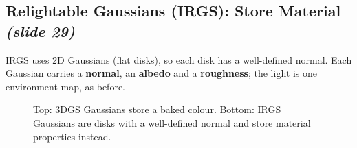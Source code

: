 \documentclass[11pt,a4paper]{article}
\newcommand{\slideone}[1]{\texorpdfstring{\emph{(slide #1)}}{(slide #1)}}
\newcommand{\w}{{\bm{\omega}}}
\newcommand{\xx}{\boldsymbol{x}}
\theoremstyle{definition}
\theoremstyle{plain}
\theoremstyle{remark}
\begin{document}
\subsection{Relightable Gaussians (IRGS): Store Material \slideone{29}}

IRGS uses 2D Gaussians (flat disks), so each disk has a well-defined normal. Each Gaussian carries a \textbf{normal}, an \textbf{albedo} and a \textbf{roughness}; the light is one environment map, as before.

\begin{figure}[!htbp]\centering
\newcommand{\gaussians}{%
 \draw[-Latex,thick] (7.6,0)--(0.7,0);
 \draw[thick,fill=blue!35] (0.3,0) circle (0.22);
 \begin{scope}[rotate around={15:(2.6,0)}]\filldraw[fill=blue!25,draw=blue!50] (2.6,0) ellipse (0.95 and 0.3);\end{scope}
 \begin{scope}[rotate around={85:(4.6,0)}]\filldraw[fill=red!25,draw=red!50] (4.6,0) ellipse (0.8 and 0.28);\end{scope}
 \begin{scope}[rotate around={-30:(6.6,0)}]\filldraw[fill=violet!25,draw=violet!50] (6.6,0) ellipse (0.9 and 0.3);\end{scope}}
\caption{Top: 3DGS Gaussians store a baked colour. Bottom: IRGS Gaussians are disks with a well-defined normal and store material properties instead.}
\end{figure}
\end{document}
